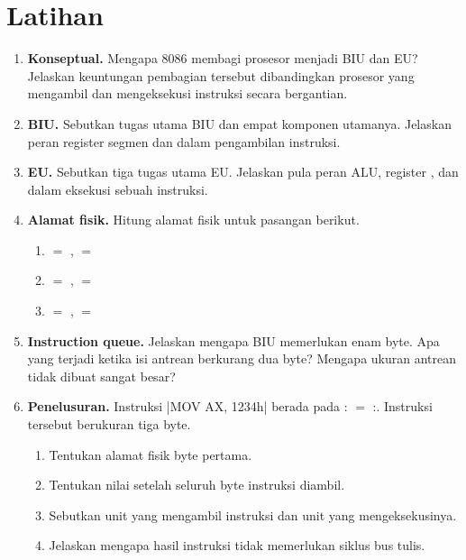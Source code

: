 \section{Latihan}
\label{sec:latihan-bab4}

\begin{enumerate}
    \item \textbf{Konseptual.} Mengapa 8086 membagi prosesor menjadi
          BIU dan EU? Jelaskan keuntungan pembagian tersebut
          dibandingkan prosesor yang mengambil dan mengeksekusi
          instruksi secara bergantian.

    \item \textbf{BIU.} Sebutkan tugas utama BIU dan empat komponen
          utamanya. Jelaskan peran register segmen dan
           dalam pengambilan instruksi.

    \item \textbf{EU.} Sebutkan tiga tugas utama EU. Jelaskan pula
          peran ALU, register , dan  dalam
          eksekusi sebuah instruksi.

    \item \textbf{Alamat fisik.} Hitung alamat fisik untuk pasangan
          berikut.
          \begin{enumerate}
              \item {} $=$ ,  $=$ 
              \item {} $=$ ,  $=$ 
              \item {} $=$ ,  $=$ 
          \end{enumerate}

    \item \textbf{Instruction queue.} Jelaskan mengapa BIU memerlukan
           enam byte. Apa yang terjadi ketika isi antrean
          berkurang dua byte? Mengapa ukuran antrean tidak dibuat
          sangat besar?

    \item \textbf{Penelusuran.} Instruksi \lstasm|MOV AX, 1234h|
          berada pada : $=$ :.
          Instruksi tersebut berukuran tiga byte.
          \begin{enumerate}
              \item Tentukan alamat fisik byte pertama.
              \item Tentukan nilai  setelah seluruh byte
                    instruksi diambil.
              \item Sebutkan unit yang mengambil instruksi dan unit
                    yang mengeksekusinya.
              \item Jelaskan mengapa hasil instruksi tidak memerlukan
                    siklus bus tulis.
          \end{enumerate}


\end{enumerate}
